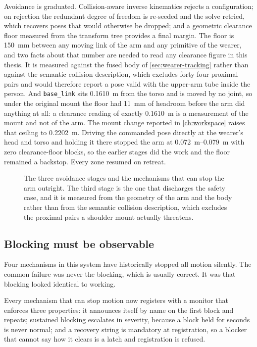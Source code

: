 Avoidance is graduated. Collision-aware inverse kinematics rejects a
configuration; on rejection the redundant degree of freedom is re-seeded and
the solve retried, which recovers poses that would otherwise be dropped; and a
geometric clearance floor measured from the transform tree provides a final
margin. The floor is \SI{150}{\milli\metre} between any moving link of the arm
and any primitive of the wearer, and two facts about that number are needed to
read any clearance figure in this thesis. It is measured against the fused
body of \cref{sec:wearer-tracking} rather than against the semantic collision
description, which excludes forty-four proximal pairs and would therefore
report a pose valid with the upper-arm tube inside the person. And
\texttt{base\_link} sits \SI{0.1610}{\metre} from the torso and is moved by no
joint, so under the original mount the floor had \SI{11}{\milli\metre} of
headroom before the arm did anything at all: a clearance reading of exactly
\SI{0.1610}{\metre} is a measurement of the mount and not of the arm. The
mount change reported in \cref{ch:workspace} raises that ceiling to
\SI{0.2202}{\metre}. Driving the commanded pose directly at the wearer's head and torso and
holding it there stopped the arm at \SIrange{0.072}{0.079}{\metre} with zero
clearance-floor blocks, so the earlier stages did the work and the floor
remained a backstop. Every zone resumed on retreat.

\begin{figure}[htbp]
  \centering
  
  \caption[The safety layers]{The three avoidance stages and the mechanisms
  that can stop the arm outright. The third stage is the one that discharges
  the safety case, and it is measured from the geometry of the arm and the
  body rather than from the semantic collision description, which excludes the
  proximal pairs a shoulder mount actually threatens.}
  \label{fig:safety}
\end{figure}

\subsection{Blocking must be observable}
\label{sec:blocking-observable}

Four mechanisms in this system have historically stopped all motion silently.
The common failure was never the blocking, which is usually correct. It was
that blocking looked identical to working.

Every mechanism that can stop motion now registers with a monitor that
enforces three properties: it announces itself by name on the first block and
repeats; sustained blocking escalates in severity, because a block held for
seconds is never normal; and a recovery string is mandatory at registration,
so a blocker that cannot say how it clears is a latch and registration is
refused.

